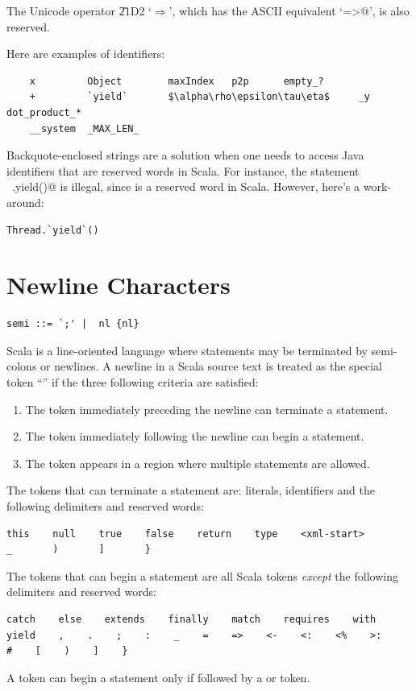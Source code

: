 The Unicode operator \U{21D2} `$\Rightarrow$', which has the ASCII equivalent
`\lstinline@=>@', is also reserved.

\example
Here are examples of identifiers:
\begin{lstlisting}
    x         Object        maxIndex   p2p      empty_?
    +         `yield`       $\alpha\rho\epsilon\tau\eta$     _y       dot_product_*
    __system  _MAX_LEN_     
\end{lstlisting}

\example Backquote-enclosed strings are a solution when one needs to
access Java identifiers that are reserved words in Scala. For
instance, the statement ~\lstinline@Thread.yield()@ is illegal, since
 is a reserved word in Scala. However, here's a
work-around:
\begin{lstlisting}
Thread.`yield`()
\end{lstlisting}

\section{Newline Characters}\label{sec:newlines}

\syntax\begin{lstlisting}
semi ::= `;' |  nl {nl}
\end{lstlisting}

Scala is a line-oriented language where statements may be terminated by
semi-colons or newlines. A newline in a Scala source text is treated
as the special token ``\lstinline@nl@'' if the three following
criteria are satisfied:
\begin{enumerate}
\item
The token immediately preceding the newline can terminate a statement.
\item
The token immediately following the newline can begin a statement.
\item
The token appears in a region where multiple statements are allowed.
\end{enumerate}

The tokens that can terminate a statement are: literals, identifiers
and the following delimiters and reserved words:
\begin{lstlisting}
this    null    true    false    return    type    <xml-start>    
_       )       ]       }
\end{lstlisting}

The tokens that can begin a statement are all Scala tokens {\em except}
the following delimiters and reserved words:
\begin{lstlisting}
catch    else    extends    finally    match    requires    with    
yield    ,    .    ;    :    _    =    =>    <-    <:    <%    >:    
#    [    )    ]    }
\end{lstlisting}
A \lstinline@case@ token can begin a statement only if followed by a
\lstinline@class@ or \lstinline@object@ token.

